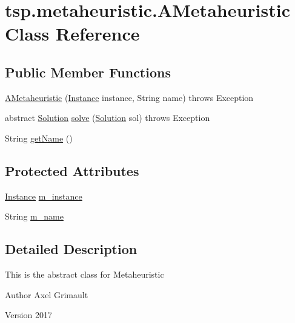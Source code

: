 \hypertarget{classtsp_1_1metaheuristic_1_1_a_metaheuristic}{}\section{tsp.\+metaheuristic.\+A\+Metaheuristic Class Reference}
\label{classtsp_1_1metaheuristic_1_1_a_metaheuristic}
\subsection*{Public Member Functions}
\begin{DoxyCompactItemize}
\item 
\mbox{\hyperlink{classtsp_1_1metaheuristic_1_1_a_metaheuristic_a8a5f85f47ae51d4e389c3335f5c32350}{A\+Metaheuristic}} (\mbox{\hyperlink{classtsp_1_1_instance}{Instance}} instance, String name)  throws Exception 
\item 
abstract \mbox{\hyperlink{classtsp_1_1_solution}{Solution}} \mbox{\hyperlink{classtsp_1_1metaheuristic_1_1_a_metaheuristic_a0bff8acfcbdb9170d9d6090d3b66efff}{solve}} (\mbox{\hyperlink{classtsp_1_1_solution}{Solution}} sol)  throws Exception
\item 
String \mbox{\hyperlink{classtsp_1_1metaheuristic_1_1_a_metaheuristic_af6a576aa8c6e48ebd22ea5d02cf7e1d6}{get\+Name}} ()
\end{DoxyCompactItemize}
\subsection*{Protected Attributes}
\begin{DoxyCompactItemize}
\item 
\mbox{\hyperlink{classtsp_1_1_instance}{Instance}} \mbox{\hyperlink{classtsp_1_1metaheuristic_1_1_a_metaheuristic_aa25dbfb4c96866bce856787dd30352b5}{m\+\_\+instance}}
\item 
String \mbox{\hyperlink{classtsp_1_1metaheuristic_1_1_a_metaheuristic_a9e4b4a3b7555598bf92d825ada066a75}{m\+\_\+name}}
\end{DoxyCompactItemize}


\subsection{Detailed Description}
This is the abstract class for Metaheuristic \begin{DoxyAuthor}{Author}
Axel Grimault 
\end{DoxyAuthor}
\begin{DoxyVersion}{Version}
2017 
\end{DoxyVersion}


